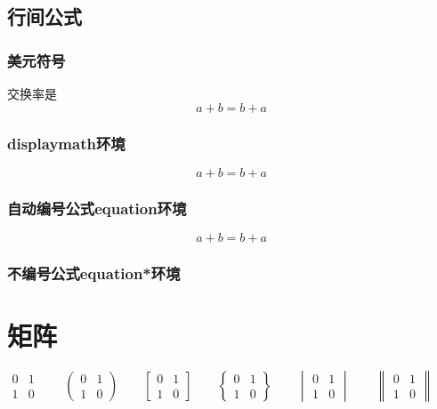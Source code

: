 \documentclass[10pt]{article} %
\begin{document}
	\subsection{行间公式}
	\subsubsection{美元符号}
	交换率是 $$a+b = b+a$$
	\subsubsection{displaymath环境}
	\begin{displaymath}
		a+b=b+a
	\end{displaymath}
	\subsubsection{自动编号公式equation环境}
	\begin{equation}
		a+b = b+a \label{eq:commutative}
	\end{equation}
	\subsubsection{不编号公式equation*环境}
	\section{矩阵}
	$$
	\begin{matrix} %
		0 & 1 \\
		1 & 0
	\end{matrix} \qquad
	\begin{pmatrix} %
	0 & 1 \\
	1 & 0
	\end{pmatrix} \qquad
	\begin{bmatrix} %
	0 & 1 \\
	1 & 0
	\end{bmatrix} \qquad
	\begin{Bmatrix} %
	0 & 1 \\
	1 & 0
	\end{Bmatrix} \qquad
	\begin{vmatrix} %
	0 & 1 \\
	1 & 0
	\end{vmatrix} \qquad
	\begin{Vmatrix} %
	0 & 1 \\
	1 & 0
	\end{Vmatrix} \qquad
	$$
\end{document}

